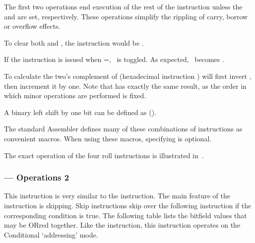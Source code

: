The first two operations end execution of the rest of the instruction
unless the \Lreg{} and \Vreg{} are set, respectively. These operations
simplify the rippling of carry, borrow or overflow effects.

To clear both \A{} and \Lreg, the instruction would be .

If the  instruction is issued when \A=, \Lreg\ is
toggled. As expected, \A\ becomes .

To calculate the two's complement of \A{}  (hexadecimal
instruction ) will first invert \A{}, then increment it by
one. Note that  has exactly the same result, as the
order in which minor operations are performed is fixed.

A binary left shift by one bit can be defined as 
().

The standard Assembler defines many of these combinations of instructions as
convenient macros. When using these macros, specifying  is optional.

The exact operation of the four roll instructions is illustrated
in~.

\subsubsection{ — Operations 2}
\label{sec:instruction-OP2}

This instruction is very similar to the  instruction. The main
feature of the  instruction is skipping. Skip instructions skip over
the following instruction if the corresponding condition is true. The following
table lists the  bitfield values that may be ORred together. Like
the  instruction, this instruction operates on the Conditional
‘addressing’ mode.

